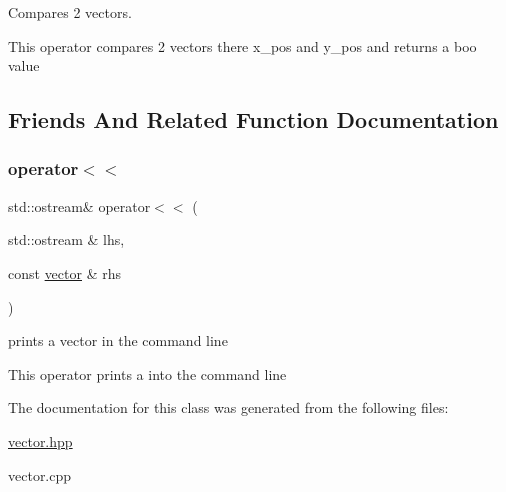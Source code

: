 Compares 2 vectors. 

This operator compares 2 vectors there x\+\_\+pos and y\+\_\+pos and returns a boo value 

\subsection{Friends And Related Function Documentation}
\mbox{\label{classvector_a7a6813f75dabd6f9575f9d6f91890255}} 
\subsubsection{\texorpdfstring{operator$<$$<$}{operator<<}}
{\footnotesize\ttfamily std\+::ostream\& operator$<$$<$ (\begin{DoxyParamCaption}\item[{std\+::ostream \&}]{lhs,  }\item[{const \hyperlink{classvector}{vector} \&}]{rhs }\end{DoxyParamCaption})\hspace{0.3cm}{\ttfamily [friend]}}



prints a vector in the command line 

This operator prints a into the command line 

The documentation for this class was generated from the following files\+:\begin{DoxyCompactItemize}
\item 
\hyperlink{vector_8hpp}{vector.\+hpp}\item 
vector.\+cpp\end{DoxyCompactItemize}
